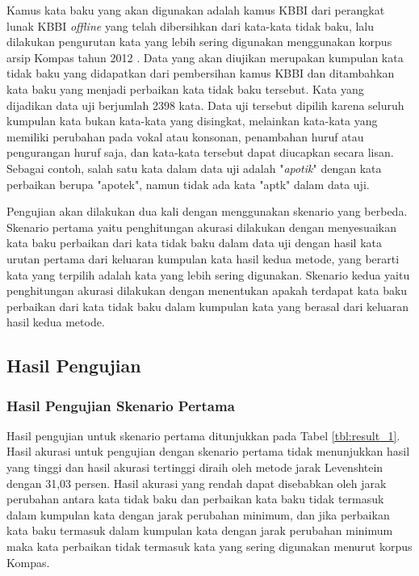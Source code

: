 Kamus kata baku yang akan digunakan adalah kamus KBBI dari perangkat lunak KBBI \textit{offline} \parencite{sinaukbbi} yang telah dibersihkan dari kata-kata tidak baku, lalu dilakukan pengurutan kata yang lebih sering digunakan menggunakan korpus arsip Kompas tahun 2012 \parencite{lanin2013distribusi}. Data yang akan diujikan merupakan kumpulan kata tidak baku yang didapatkan dari pembersihan kamus KBBI dan ditambahkan kata baku yang menjadi perbaikan kata tidak baku tersebut. Kata yang dijadikan data uji berjumlah 2398 kata. Data uji tersebut dipilih karena seluruh kumpulan kata bukan kata-kata yang disingkat, melainkan kata-kata yang memiliki perubahan pada vokal atau konsonan, penambahan huruf atau pengurangan huruf saja, dan kata-kata tersebut dapat diucapkan secara lisan. Sebagai contoh, salah satu kata dalam data uji adalah "\textit{apotik}" dengan kata perbaikan berupa "apotek", namun tidak ada kata "aptk" dalam data uji.

Pengujian akan dilakukan dua kali dengan menggunakan skenario yang berbeda. Skenario pertama yaitu penghitungan akurasi dilakukan dengan menyesuaikan kata baku perbaikan dari kata tidak baku dalam data uji dengan hasil kata urutan pertama dari keluaran kumpulan kata hasil kedua metode, yang berarti kata yang terpilih adalah kata yang lebih sering digunakan. Skenario kedua yaitu penghitungan akurasi dilakukan dengan menentukan apakah terdapat kata baku perbaikan dari kata tidak baku dalam kumpulan kata yang berasal dari keluaran hasil kedua metode.

\subsection{Hasil Pengujian}

\subsubsection{Hasil Pengujian Skenario Pertama}

Hasil pengujian untuk skenario pertama ditunjukkan pada Tabel \ref{tbl:result_1}. Hasil akurasi untuk pengujian dengan skenario pertama tidak menunjukkan hasil yang tinggi dan hasil akurasi tertinggi diraih oleh metode jarak Levenshtein dengan 31,03 persen. Hasil akurasi yang rendah dapat disebabkan oleh jarak perubahan antara kata tidak baku dan perbaikan kata baku tidak termasuk dalam kumpulan kata dengan  jarak perubahan minimum, dan jika perbaikan kata baku termasuk dalam kumpulan kata dengan jarak perubahan minimum maka kata perbaikan tidak termasuk kata yang sering digunakan menurut korpus Kompas.

